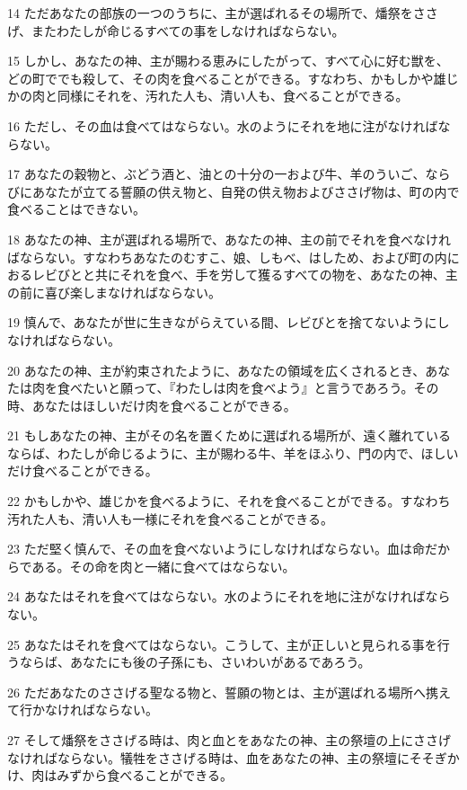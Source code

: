 \par 14 ただあなたの部族の一つのうちに、主が選ばれるその場所で、燔祭をささげ、またわたしが命じるすべての事をしなければならない。
\par 15 しかし、あなたの神、主が賜わる恵みにしたがって、すべて心に好む獣を、どの町ででも殺して、その肉を食べることができる。すなわち、かもしかや雄じかの肉と同様にそれを、汚れた人も、清い人も、食べることができる。
\par 16 ただし、その血は食べてはならない。水のようにそれを地に注がなければならない。
\par 17 あなたの穀物と、ぶどう酒と、油との十分の一および牛、羊のういご、ならびにあなたが立てる誓願の供え物と、自発の供え物およびささげ物は、町の内で食べることはできない。
\par 18 あなたの神、主が選ばれる場所で、あなたの神、主の前でそれを食べなければならない。すなわちあなたのむすこ、娘、しもべ、はしため、および町の内におるレビびとと共にそれを食べ、手を労して獲るすべての物を、あなたの神、主の前に喜び楽しまなければならない。
\par 19 慎んで、あなたが世に生きながらえている間、レビびとを捨てないようにしなければならない。
\par 20 あなたの神、主が約束されたように、あなたの領域を広くされるとき、あなたは肉を食べたいと願って、『わたしは肉を食べよう』と言うであろう。その時、あなたはほしいだけ肉を食べることができる。
\par 21 もしあなたの神、主がその名を置くために選ばれる場所が、遠く離れているならば、わたしが命じるように、主が賜わる牛、羊をほふり、門の内で、ほしいだけ食べることができる。
\par 22 かもしかや、雄じかを食べるように、それを食べることができる。すなわち汚れた人も、清い人も一様にそれを食べることができる。
\par 23 ただ堅く慎んで、その血を食べないようにしなければならない。血は命だからである。その命を肉と一緒に食べてはならない。
\par 24 あなたはそれを食べてはならない。水のようにそれを地に注がなければならない。
\par 25 あなたはそれを食べてはならない。こうして、主が正しいと見られる事を行うならば、あなたにも後の子孫にも、さいわいがあるであろう。
\par 26 ただあなたのささげる聖なる物と、誓願の物とは、主が選ばれる場所へ携えて行かなければならない。
\par 27 そして燔祭をささげる時は、肉と血とをあなたの神、主の祭壇の上にささげなければならない。犠牲をささげる時は、血をあなたの神、主の祭壇にそそぎかけ、肉はみずから食べることができる。
